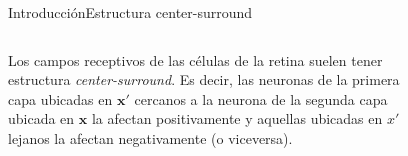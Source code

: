 \documentclass[
    11pt, %
    aspectratio=169, %
]{beamer}
\begin{document}
\begin{frame}{Introducción}{Estructura center-surround}
    \begin{columns}[c] %

    
		\begin{column}{0.45\textwidth}

Los campos receptivos de las células de la retina suelen tener estructura \emph{center-surround}.
Es decir, las neuronas de la primera capa ubicadas en $\mathbf{x}'$ cercanos a la neurona de la segunda capa ubicada en $\mathbf{x}$ la afectan positivamente y 
aquellas ubicadas en $x'$ lejanos la afectan negativamente (o viceversa).
 
               
		\end{column}
  		\begin{column}{0.55\textwidth} %
                 \begin{figure}[h!]
                    \centering
                    \includegraphics[angle=0, width=5.5cm]{Images/intro/center_surrond.pdf}
                \end{figure}
		\end{column}		
	\end{columns}
\end{frame}
\end{document}
